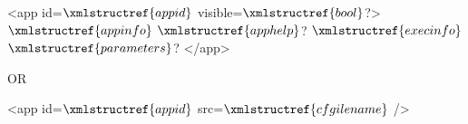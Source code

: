 <app id=$\xmlstructref{appid}$ visible=$\xmlstructref{bool}$?>
  $\xmlstructref{appinfo}$
  $\xmlstructref{apphelp}$?
  $\xmlstructref{execinfo}$
  $\xmlstructref{parameters}$?
</app>

OR

<app id=$\xmlstructref{appid}$ src=$\xmlstructref{cfgilename}$ />
